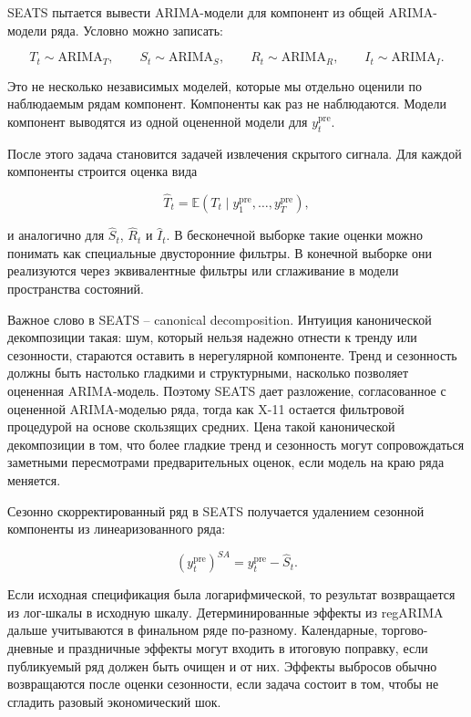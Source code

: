\documentclass[12pt,fleqn]{article}
\begin{document}
SEATS пытается вывести ARIMA-модели для компонент из общей ARIMA-модели ряда.
Условно можно записать:

\[
T_t \sim \mathrm{ARIMA}_T,
\qquad
S_t \sim \mathrm{ARIMA}_S,
\qquad
R_t \sim \mathrm{ARIMA}_R,
\qquad
I_t \sim \mathrm{ARIMA}_I.
\]

Это не несколько независимых моделей, которые мы отдельно оценили по наблюдаемым рядам компонент.
Компоненты как раз не наблюдаются.
Модели компонент выводятся из одной оцененной модели для \(y_t^{\mathrm{pre}}\).

После этого задача становится задачей извлечения скрытого сигнала.
Для каждой компоненты строится оценка вида

\[
\hat T_t
=
\mathbb{E}
\left(
T_t
\mid
y_1^{\mathrm{pre}},\ldots,y_T^{\mathrm{pre}}
\right),
\]

и аналогично для \(\hat S_t\), \(\hat R_t\) и \(\hat I_t\).
В бесконечной выборке такие оценки можно понимать как специальные двусторонние фильтры.
В конечной выборке они реализуются через эквивалентные фильтры или сглаживание в модели пространства состояний.

Важное слово в SEATS -- canonical decomposition.
Интуиция канонической декомпозиции такая: шум, который нельзя надежно отнести к тренду или сезонности, стараются оставить в нерегулярной компоненте.
Тренд и сезонность должны быть настолько гладкими и структурными, насколько позволяет оцененная ARIMA-модель.
Поэтому SEATS дает разложение, согласованное с оцененной ARIMA-моделью ряда, тогда как X-11 остается фильтровой процедурой на основе скользящих средних.
Цена такой канонической декомпозиции в том, что более гладкие тренд и сезонность могут сопровождаться заметными пересмотрами предварительных оценок, если модель на краю ряда меняется.

Сезонно скорректированный ряд в SEATS получается удалением сезонной компоненты из линеаризованного ряда:

\[
\left(y_t^{\mathrm{pre}}\right)^{SA}
=
y_t^{\mathrm{pre}}
-\hat S_t.
\]

Если исходная спецификация была логарифмической, то результат возвращается из лог-шкалы в исходную шкалу.
Детерминированные эффекты из regARIMA дальше учитываются в финальном ряде по-разному.
Календарные, торгово-дневные и праздничные эффекты могут входить в итоговую поправку, если публикуемый ряд должен быть очищен и от них.
Эффекты выбросов обычно возвращаются после оценки сезонности, если задача состоит в том, чтобы не сгладить разовый экономический шок.
\end{document}
